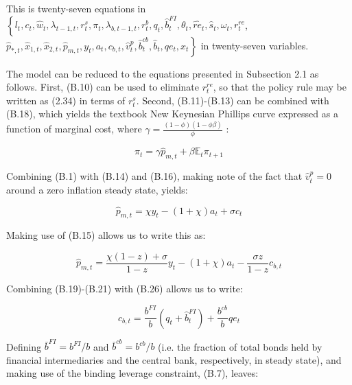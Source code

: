 \documentclass[10pt]{article}
\begin{document}
This is twenty-seven equations in $\left\{l_{t}, c_{t}, \widehat{w}_{t}, \lambda_{t-1, t}, r_{t}^{s}, \pi_{t}, \lambda_{b, t-1, t}, r_{t}^{b}, q_{t}, \widehat{b}_{t}^{F I}, \theta_{t}, \widehat{r e}_{t}, \widehat{s}_{t}, \omega_{t}, r_{t}^{r e}\right.$, $\left.\widehat{p}_{*, t}, \widehat{x}_{1, t}, \widehat{x}_{2, t}, \widehat{p}_{m, t}, y_{t}, a_{t}, c_{b, t}, \widehat{v}_{t}^{p}, \widehat{b}_{t}^{c b}, \widehat{b}_{t}, q e_{t}, x_{t}\right\}$ in twenty-seven variables.

The model can be reduced to the equations presented in Subsection 2.1 as follows. First, (B.10) can be used to eliminate $r_{t}^{r e}$, so that the policy rule may be written as (2.34) in terms of $r_{t}^{s}$. Second, (B.11)-(B.13) can be combined with (B.18), which yields the textbook New Keynesian Phillips curve expressed as a function of marginal cost, where $\gamma=\frac{(1-\phi)(1-\phi \beta)}{\phi}$ :

\begin{equation*}
\pi_{t}=\gamma \widehat{p}_{m, t}+\beta \mathbb{E}_{t} \pi_{t+1} \tag{B.28}
\end{equation*}

Combining (B.1) with (B.14) and (B.16), making note of the fact that $\widehat{v}_{t}^{p}=0$ around a zero inflation steady state, yields:

\begin{equation*}
\widehat{p}_{m, t}=\chi y_{t}-(1+\chi) a_{t}+\sigma c_{t} \tag{B.29}
\end{equation*}

Making use of (B.15) allows us to write this as:

\begin{equation*}
\widehat{p}_{m, t}=\frac{\chi(1-z)+\sigma}{1-z} y_{t}-(1+\chi) a_{t}-\frac{\sigma z}{1-z} c_{b, t} \tag{B.30}
\end{equation*}

Combining (B.19)-(B.21) with (B.26) allows us to write:

\begin{equation*}
c_{b, t}=\frac{b^{F I}}{b}\left(q_{t}+\widehat{b}_{t}^{F I}\right)+\frac{b^{c b}}{b} q e_{t} \tag{B.31}
\end{equation*}

Defining $\bar{b}^{F I}=b^{F I} / b$ and $\bar{b}^{c b}=b^{c b} / b$ (i.e. the fraction of total bonds held by financial intermediaries and the central bank, respectively, in steady state), and making use of the binding leverage constraint, (B.7), leaves:
\end{document}
